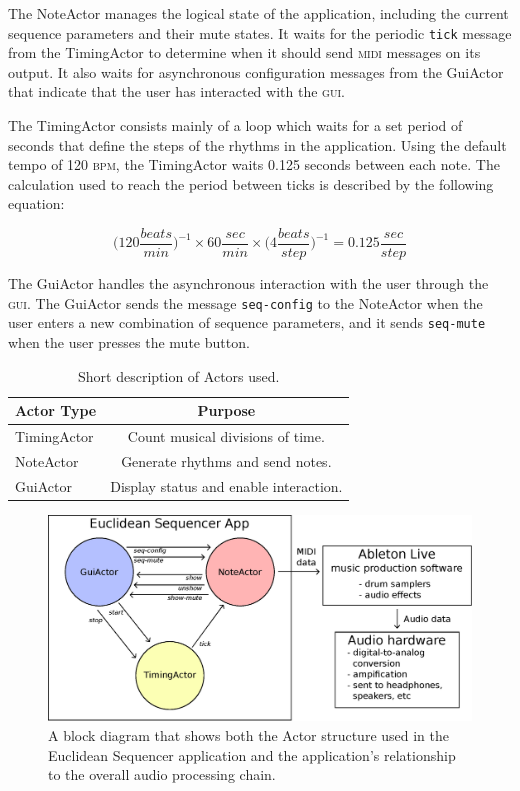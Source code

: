 \documentclass{sig-alternate-05-2015}
\begin{document}
The NoteActor manages the logical state of the application, including the current sequence parameters and their mute states. It waits for the periodic \texttt{tick} message from the TimingActor to determine when it should send \textsc{midi} messages on its output. It also waits for asynchronous configuration messages from the GuiActor that indicate that the user has interacted with the \textsc{gui}. 

The TimingActor consists mainly of a loop which waits for a set period of seconds that define the steps of the rhythms in the application. Using the default tempo of 120 \textsc{bpm}, the TimingActor waits 0.125 seconds between each note. The calculation used to reach the period between ticks is described by the following equation:

\begin{equation*}
\bigg(120 \frac{beats}{min} \bigg)^{-1} \times 60 \frac{sec}{min} \times \bigg(4 \frac{beats}{step} \bigg) ^{-1} = 0.125 \frac{sec}{step}
\label{timing-eq}
\end{equation*}

The GuiActor handles the asynchronous interaction with the user through the \textsc{gui}. The GuiActor sends the message \texttt{seq-config} to the NoteActor when the user enters a new combination of sequence parameters, and it sends \texttt{seq-mute} when the user presses the mute button.

\begin{table}
\centering
\caption{Short description of Actors used.}
\begin{tabular}{|l|c|} \hline
\textbf{Actor Type} & \textbf{Purpose}\\ \hline \hline
TimingActor & Count musical divisions of time. \\ \hline
NoteActor & Generate rhythms and send notes. \\ \hline
GuiActor & Display status and enable interaction. \\ \hline
\end{tabular}
\end{table}


\begin{figure}
\centering
\includegraphics[width=\linewidth]{figs/diagram.eps}
\caption{A block diagram that shows both the Actor structure used in
the Euclidean Sequencer application and the application's relationship
to the overall audio processing chain.}
\label{block-diagram}
\end{figure}
\end{document}
